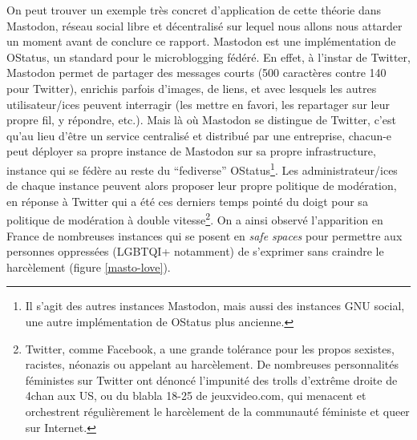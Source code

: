 \documentclass[a4paper,12pt]{report}
\begin{document}
On peut trouver un exemple très concret d'application de cette théorie dans Mastodon, réseau social libre et décentralisé sur lequel nous allons nous attarder un moment avant de conclure ce rapport. Mastodon est une implémentation de OStatus, un standard pour le microblogging fédéré. En effet, à l'instar de Twitter, Mastodon permet de partager des messages courts (500 caractères contre 140 pour Twitter), enrichis parfois d'images, de liens, et avec lesquels les autres utilisateur/ices peuvent interragir (les mettre en favori, les repartager sur leur propre fil, y répondre, etc.). Mais là où Mastodon se distingue de Twitter, c'est qu'au lieu d'être un service centralisé et distribué par une entreprise, chacun-e peut déployer sa propre instance de Mastodon sur sa propre infrastructure, instance qui se fédère au reste du ``fediverse'' OStatus\footnote{Il s'agit des autres instances Mastodon, mais aussi des instances GNU social, une autre implémentation de OStatus plus ancienne.}. Les administrateur/ices de chaque instance peuvent alors proposer leur propre politique de modération, en réponse à Twitter qui a été ces derniers temps pointé du doigt pour sa politique de modération à double vitesse\footnote{Twitter, comme Facebook, a une grande tolérance pour les propos sexistes, racistes, néonazis ou appelant au harcèlement. De nombreuses personnalités féministes sur Twitter ont dénoncé l'impunité des trolls d'extrême droite de 4chan aux US, ou du blabla 18-25 de jeuxvideo.com, qui menacent et orchestrent régulièrement le harcèlement de la communauté féministe et queer sur Internet.}. On a ainsi observé l'apparition en France de nombreuses instances qui se posent en \textit{safe spaces} pour permettre aux personnes oppressées (LGBTQI+ notamment) de s'exprimer sans craindre le harcèlement (figure \ref{masto-love}).
\end{document}
